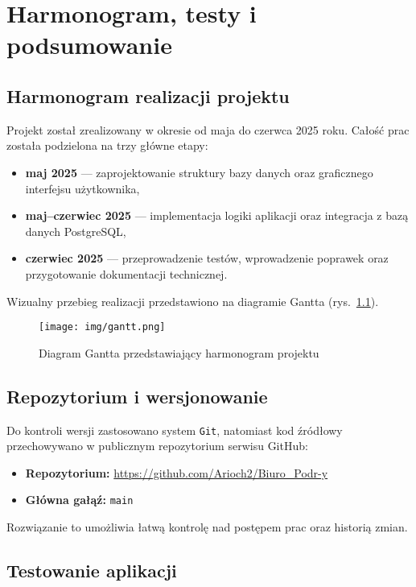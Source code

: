 \chapter{Harmonogram, testy i podsumowanie}

\section{Harmonogram realizacji projektu}

Projekt został zrealizowany w okresie od maja do czerwca 2025 roku. Całość prac została podzielona na trzy główne etapy:

\begin{itemize}
    \item \textbf{maj 2025} — zaprojektowanie struktury bazy danych oraz graficznego interfejsu użytkownika,
    \item \textbf{maj–czerwiec 2025} — implementacja logiki aplikacji oraz integracja z bazą danych PostgreSQL,
    \item \textbf{czerwiec 2025} — przeprowadzenie testów, wprowadzenie poprawek oraz przygotowanie dokumentacji technicznej.
\end{itemize}

Wizualny przebieg realizacji przedstawiono na diagramie Gantta (rys.~\ref{fig:gantt}).

\begin{figure}[H]
    \centering
    \texttt{[image: img/gantt.png]}
    \caption{Diagram Gantta przedstawiający harmonogram projektu}
    \label{fig:gantt}
\end{figure}

\section{Repozytorium i wersjonowanie}

Do kontroli wersji zastosowano system \texttt{Git}, natomiast kod źródłowy przechowywano w publicznym repozytorium serwisu GitHub:

\begin{itemize}
    \item \textbf{Repozytorium:} \url{https://github.com/Arioch2/Biuro_Podr-y}
    \item \textbf{Główna gałąź:} \texttt{main}
\end{itemize}

Rozwiązanie to umożliwia łatwą kontrolę nad postępem prac oraz historią zmian.

\section{Testowanie aplikacji}

